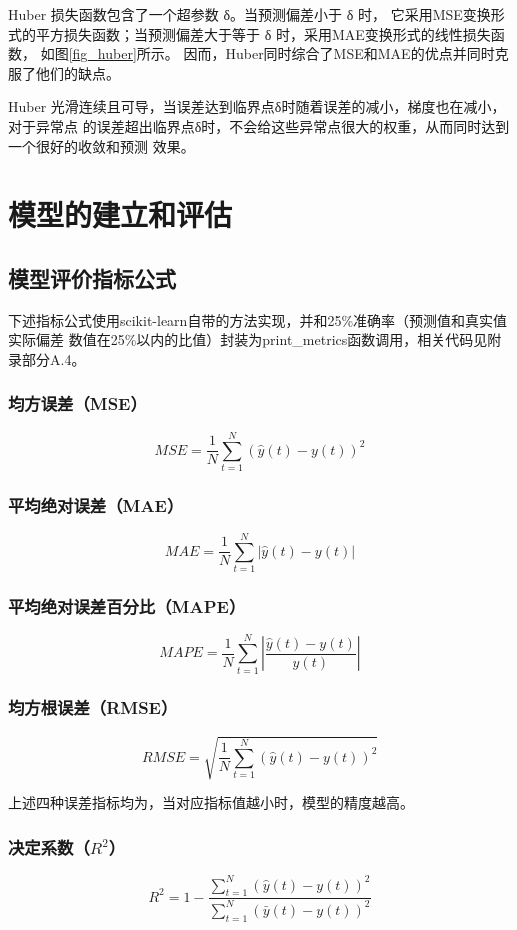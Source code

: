\documentclass[AutoFakeBold]{LZUThesis}
\begin{document}
Huber 损失函数\cite{huber1992robust}包含了一个超参数 δ。当预测偏差小于 δ 时，
它采用MSE变换形式的平方损失函数；当预测偏差大于等于 δ 时，采用MAE变换形式的线性损失函数，
如图\ref{fig_huber}所示。
因而，Huber同时综合了MSE和MAE的优点并同时克服了他们的缺点。

Huber 光滑连续且可导，当误差达到临界点δ时随着误差的减小，梯度也在减小，对于异常点
的误差超出临界点δ时，不会给这些异常点很大的权重，从而同时达到一个很好的收敛和预测
效果。

\chapter{模型的建立和评估}
\section{模型评价指标公式}
下述指标公式使用scikit-learn自带的方法实现，并和25\%准确率（预测值和真实值实际偏差
数值在25\%以内的比值）封装为print\_metrics函数调用，相关代码见附录部分A.4。

\subsection{均方误差（MSE）}
$$MSE=\frac{1}{N}\sum_{t=1}^{N}\left(\hat{y}\left(t\right)-y\left(t\right)\right)^2$$

\subsection{平均绝对误差（MAE）}
$$MAE=\frac{1}{N}\sum_{t=1}^{N}\left|\hat{y}\left(t\right)-y\left(t\right)\right|$$

\subsection{平均绝对误差百分比（MAPE）}
$$MAPE=\frac{1}{N}\sum_{t=1}^{N}\left|\frac{\hat{y}\left(t\right)-y\left(t\right)}{y\left(t\right)}\right|$$

\subsection{均方根误差（RMSE）}
$$RMSE=\sqrt{\frac{1}{N}\sum_{t=1}^{N}\left(\hat{y}\left(t\right)-y\left(t\right)\right)^2}$$

上述四种误差指标均为，当对应指标值越小时，模型的精度越高。

\subsection{决定系数（$R^2$）}
$$R^2=1-\frac{\sum_{t=1}^{N}(\hat{y}\left(t\right)-y\left(t\right))^2}{\sum_{t=1}^{N}(\bar{y}\left(t\right)-y\left(t\right))^2}$$
\end{document}
